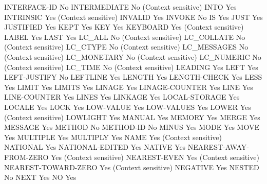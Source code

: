 INTERFACE-ID                    No
INTERMEDIATE                    No (Context sensitive)
INTO                            Yes
INTRINSIC                       Yes (Context sensitive)
INVALID                         Yes
INVOKE                          No
IS                              Yes
JUST                            Yes
JUSTIFIED                       Yes
KEPT                            Yes
KEY                             Yes
KEYBOARD                        Yes (Context sensitive)
LABEL                           Yes
LAST                            Yes
LC_ALL                          No (Context sensitive)
LC_COLLATE                      No (Context sensitive)
LC_CTYPE                        No (Context sensitive)
LC_MESSAGES                     No (Context sensitive)
LC_MONETARY                     No (Context sensitive)
LC_NUMERIC                      No (Context sensitive)
LC_TIME                         No (Context sensitive)
LEADING                         Yes
LEFT                            Yes
LEFT-JUSTIFY                    No
LEFTLINE                        Yes
LENGTH                          Yes
LENGTH-CHECK                    Yes
LESS                            Yes
LIMIT                           Yes
LIMITS                          Yes
LINAGE                          Yes
LINAGE-COUNTER                  Yes
LINE                            Yes
LINE-COUNTER                    Yes
LINES                           Yes
LINKAGE                         Yes
LOCAL-STORAGE                   Yes
LOCALE                          Yes
LOCK                            Yes
LOW-VALUE                       Yes
LOW-VALUES                      Yes
LOWER                           Yes (Context sensitive)
LOWLIGHT                        Yes
MANUAL                          Yes
MEMORY                          Yes
MERGE                           Yes
MESSAGE                         Yes
METHOD                          No
METHOD-ID                       No
MINUS                           Yes
MODE                            Yes
MOVE                            Yes
MULTIPLE                        Yes
MULTIPLY                        Yes
NAME                            Yes (Context sensitive)
NATIONAL                        Yes
NATIONAL-EDITED                 Yes
NATIVE                          Yes
NEAREST-AWAY-FROM-ZERO          Yes (Context sensitive)
NEAREST-EVEN                    Yes (Context sensitive)
NEAREST-TOWARD-ZERO             Yes (Context sensitive)
NEGATIVE                        Yes
NESTED                          No
NEXT                            Yes
NO                              Yes
